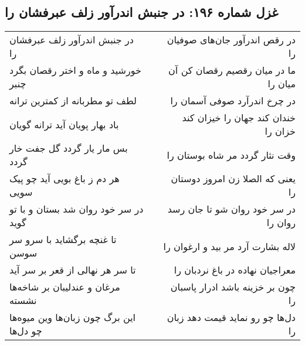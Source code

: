 \begin{center}
\section*{غزل شماره ۱۹۶: در جنبش اندرآور زلف عبرفشان را}
\label{sec:0196}
\begin{longtable}{l p{0.5cm} r}
در جنبش اندرآور زلف عبرفشان را
&&
در رقص اندرآور جان‌های صوفیان را
\\
خورشید و ماه و اختر رقصان بگرد چنبر
&&
ما در میان رقصیم رقصان کن آن میان را
\\
لطف تو مطربانه از کمترین ترانه
&&
در چرخ اندرآرد صوفی آسمان را
\\
باد بهار پویان آید ترانه گویان
&&
خندان کند جهان را خیزان کند خزان را
\\
بس مار یار گردد گل جفت خار گردد
&&
وقت نثار گردد مر شاه بوستان را
\\
هر دم ز باغ بویی آید چو پیک سویی
&&
یعنی که الصلا زن امروز دوستان را
\\
در سر خود روان شد بستان و با تو گوید
&&
در سر خود روان شو تا جان رسد روان را
\\
تا غنچه برگشاید با سرو سر سوسن
&&
لاله بشارت آرد مر بید و ارغوان را
\\
تا سر هر نهالی از قعر بر سر آید
&&
معراجیان نهاده در باغ نردبان را
\\
مرغان و عندلیبان بر شاخه‌ها نشسته
&&
چون بر خزینه باشد ادرار پاسبان را
\\
این برگ چون زبان‌ها وین میوه‌ها چو دل‌ها
&&
دل‌ها چو رو نماید قیمت دهد زبان را
\\
\end{longtable}
\end{center}
